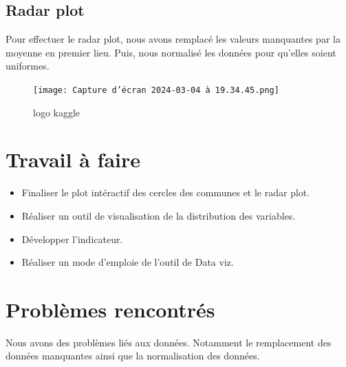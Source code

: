 \documentclass{article}
\begin{document}
\subsection{Radar plot}
Pour effectuer le radar plot, nous avons remplacé les valeurs manquantes par la moyenne en premier lieu. Puis, nous normalisé les données pour qu'elles soient uniformes. 
\begin{figure}[h]
    \centering
    \texttt{[image: Capture d’écran 2024-03-04 à 19.34.45.png]}
    \caption{logo kaggle}
    \label{fig:kaggle}
\end{figure}
\vspace{4cm}

\section{Travail à faire}
\begin{itemize}
    \item Finaliser le plot intéractif des cercles des communes et le radar plot.
    \item Réaliser un outil de visualisation de la distribution des variables.
    \item Développer l'indicateur.
    \item Réaliser un mode d'emploie de l'outil de Data viz.
\end{itemize} 

\section{Problèmes rencontrés}
Nous avons des problèmes liés aux données. Notamment le remplacement des données manquantes ainsi que la normalisation des données. 
\end{document}
